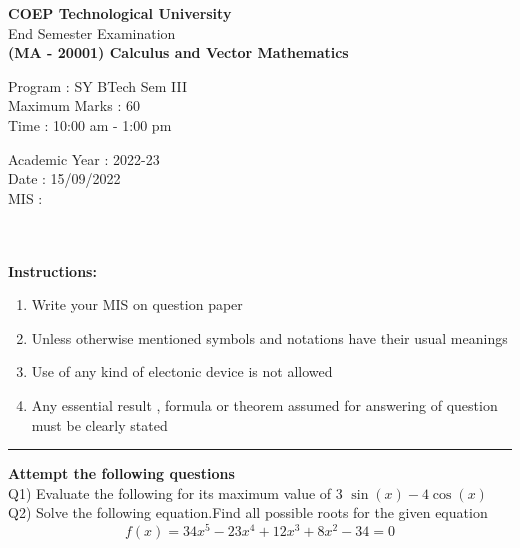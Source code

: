\documentclass[12pt]{article}
\begin{document}
	\begin{center}
	 \textbf{\huge COEP Technological University} \\
	 \vspace{4mm}
	 \large End Semester Examination\\
	 \vspace{3mm}
	 \textbf{\large (MA - 20001) Calculus and Vector Mathematics}\\
	 \vspace{3mm}
	\end{center}
\begin{flushleft}
Program : SY BTech Sem III\\
Maximum Marks : 60\\
Time : 10:00 am - 1:00 pm\\
\end{flushleft}
\vspace{-2.5cm}
\begin{flushright}
Academic Year : 2022-23\\
Date : 15/09/2022\\
MIS : \\
\end{flushright}
\\
\\
\textbf{\large Instructions: }
\begin{enumerate}
	\item Write your MIS on question paper
	\item Unless otherwise mentioned symbols and notations have their usual meanings
	\item Use of any kind of electonic device is not allowed 
	\item Any essential result , formula or theorem assumed for answering of question must be clearly stated
	
\end{enumerate}
\par\noindent\rule{\textwidth}{0.4pt}
\textbf{Attempt the following questions }
\vspace{3mm} \\
Q1) Evaluate the following for its maximum value of 3
 $\sin(x) - 4\cos(x)$ \vspace{1.5mm}
 \\
Q2) Solve the following equation.Find all possible roots for the given equation
 \\
\begin{equation*}
	f(x)=34x^5-23x^4+12x^3+8x^2-34=0
\end{equation*}\\
\end{document}
